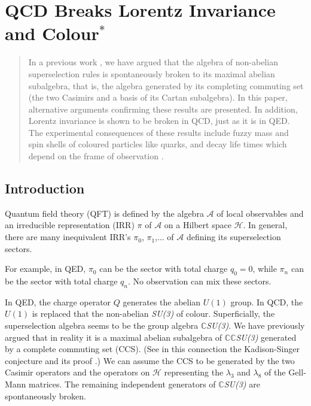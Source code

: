 \chapter[QCD Breaks Lorentz Invariance and Colour]{QCD Breaks Lorentz Invariance and Colour$^{*}$}\label{chap4}




\begin{abstract}
In a previous work \cite{chap4-key1}, we have argued that the algebra of non-abelian superselection rules is spontaneously broken to its maximal abelian subalgebra, that is, the algebra generated by its completing commuting set (the two Casimirs and a basis of its Cartan subalgebra). In this paper, alternative arguments confirming these results are presented. In addition, Lorentz invariance is shown to be broken in QCD, just as it is in QED. The experimental consequences of these results include fuzzy mass and spin shells of coloured particles like quarks, and decay life times which depend on the frame of observation \cite{chap4-key2,chap4-key3,chap4-key4}.
\end{abstract}

\section{Introduction}\label{chap4-sec1}

Quantum field theory (QFT) is defined by the algebra $\mathcal{A}$ of local observables and an irreducible representation (IRR) $\pi$ of $\mathcal{A}$ on a Hilbert space $\mathcal{H}$. In general, there are many inequivalent IRR's $\pi_{0}$, $\pi_{1}$,... of $\mathcal{A}$ defining its superselection sectors.

For example, in QED, $\pi_{0}$ can be the sector with total charge $q_{0}= 0$, while $\pi_{n}$ can be the sector with total charge $q_{n}$. No observation can mix these sectors.

In QED, the charge operator $Q$ generates the abelian $U(1)$ group. In QCD, the $U(1)$ is replaced that the non-abelian \textit{SU(3)} of colour. Superficially, the superselection algebra seems to be the group algebra $\mathbb{C}$\textit{SU(3)}. We have previously argued \cite{chap4-key1} that in reality it is a maximal abelian subalgebra of $\mathbb{CC}$\textit{SU(3)} generated by a complete commuting set (CCS). (See in this connection the Kadison-Singer conjecture and its proof \cite{chap4-key5}.) We can assume the CCS to be generated by the two Casimir operators and the operators on $\mathcal{H}$ representing the $\lambda_{3}$ and $\lambda_{8}$ of the Gell-Mann matrices. The remaining independent generators of $\mathbb{C}$\textit{SU(3)} are spontaneously broken.

